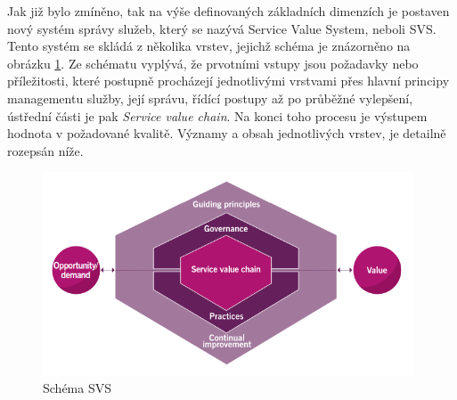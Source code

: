 \documentclass[
  digital,     %
  twoside,     %
  lof,         %
  lot,         %
]{fithesis4}
\begin{document}
\vspace{5}
Jak již bylo zmíněno, tak na výše definovaných základních dimenzích je postaven nový systém správy služeb, který se nazývá Service Value System, neboli SVS. Tento systém se skládá z několika vrstev, jejichž schéma je znázorněno na obrázku \ref{fig:SVS_schema}. Ze schématu vyplývá, že prvotními vstupy jsou požadavky nebo příležitosti, které postupně procházejí jednotlivými vrstvami přes hlavní principy managementu služby, její správu, řídící postupy až po průběžné vylepšení, ústřední části je pak \emph{Service value chain}. Na konci toho procesu je výstupem hodnota v požadované kvalitě. \parencite[s.~14]{Cartlidge2020} Významy a obsah jednotlivých vrstev, je detailně rozepsán níže. 

    \begin{figure}[b]
        \begin{center}
            \includegraphics[width=11cm]{img/SVS_schmea.png}
        \end{center}
        \caption{Schéma SVS \parencite[s.~21]{Cartlidge2020}}
        \label{fig:SVS_schema}
    \end{figure} 
\end{document}
